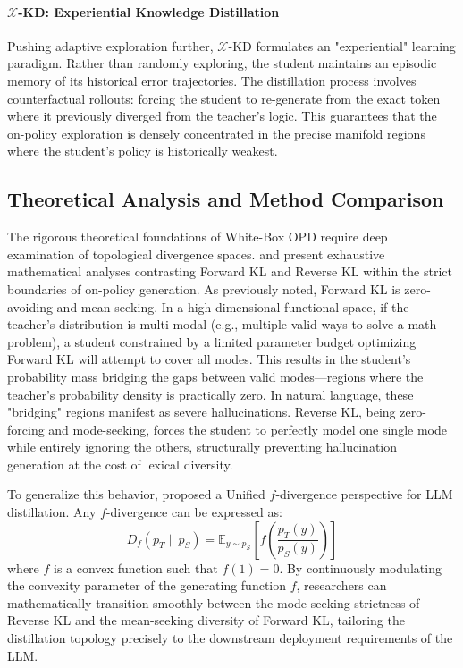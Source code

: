 \paragraph{$\mathcal{X}$-KD: Experiential Knowledge Distillation}
Pushing adaptive exploration further, $\mathcal{X}$-KD \citep{2602.12674} formulates an "experiential" learning paradigm. Rather than randomly exploring, the student maintains an episodic memory of its historical error trajectories. The distillation process involves counterfactual rollouts: forcing the student to re-generate from the exact token where it previously diverged from the teacher's logic. This guarantees that the on-policy exploration is densely concentrated in the precise manifold regions where the student's policy is historically weakest.

\subsection{Theoretical Analysis and Method Comparison}
\label{subsec:theory_whitebox}

The rigorous theoretical foundations of White-Box OPD require deep examination of topological divergence spaces. \citet{2404.02657} and \citet{2402.11890} present exhaustive mathematical analyses contrasting Forward KL and Reverse KL within the strict boundaries of on-policy generation. As previously noted, Forward KL is zero-avoiding and mean-seeking. In a high-dimensional functional space, if the teacher's distribution is multi-modal (e.g., multiple valid ways to solve a math problem), a student constrained by a limited parameter budget optimizing Forward KL will attempt to cover all modes. This results in the student's probability mass bridging the gaps between valid modes—regions where the teacher's probability density is practically zero. In natural language, these "bridging" regions manifest as severe hallucinations. Reverse KL, being zero-forcing and mode-seeking, forces the student to perfectly model one single mode while entirely ignoring the others, structurally preventing hallucination generation at the cost of lexical diversity.

To generalize this behavior, \citet{2307.15190} proposed a Unified $f$-divergence perspective for LLM distillation. Any $f$-divergence can be expressed as:
\begin{equation}
    D_f(p_T \parallel p_S) = \mathbb{E}_{y \sim p_S} \left[ f \left( \frac{p_T(y)}{p_S(y)} \right) \right]
\end{equation}
where $f$ is a convex function such that $f(1)=0$. By continuously modulating the convexity parameter of the generating function $f$, researchers can mathematically transition smoothly between the mode-seeking strictness of Reverse KL and the mean-seeking diversity of Forward KL, tailoring the distillation topology precisely to the downstream deployment requirements of the LLM.

